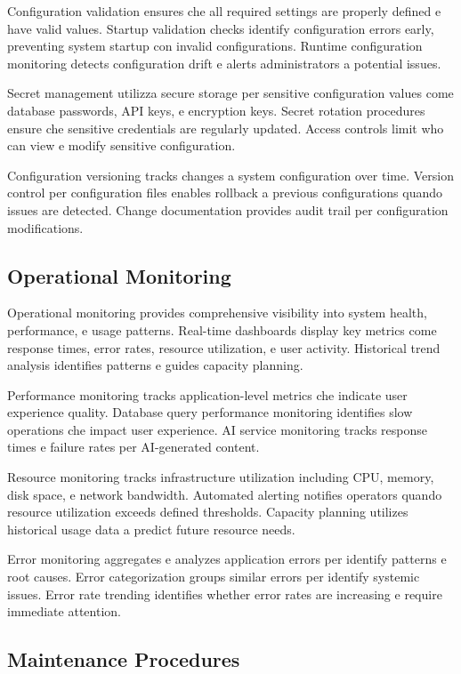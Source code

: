 \documentclass[12pt,a4paper]{article}
\begin{document}
Configuration validation ensures che all required settings are properly defined e have valid values. Startup validation checks identify configuration errors early, preventing system startup con invalid configurations. Runtime configuration monitoring detects configuration drift e alerts administrators a potential issues.

Secret management utilizza secure storage per sensitive configuration values come database passwords, API keys, e encryption keys. Secret rotation procedures ensure che sensitive credentials are regularly updated. Access controls limit who can view e modify sensitive configuration.

Configuration versioning tracks changes a system configuration over time. Version control per configuration files enables rollback a previous configurations quando issues are detected. Change documentation provides audit trail per configuration modifications.

\subsection{Operational Monitoring}

Operational monitoring provides comprehensive visibility into system health, performance, e usage patterns. Real-time dashboards display key metrics come response times, error rates, resource utilization, e user activity. Historical trend analysis identifies patterns e guides capacity planning.

Performance monitoring tracks application-level metrics che indicate user experience quality. Database query performance monitoring identifies slow operations che impact user experience. AI service monitoring tracks response times e failure rates per AI-generated content.

Resource monitoring tracks infrastructure utilization including CPU, memory, disk space, e network bandwidth. Automated alerting notifies operators quando resource utilization exceeds defined thresholds. Capacity planning utilizes historical usage data a predict future resource needs.

Error monitoring aggregates e analyzes application errors per identify patterns e root causes. Error categorization groups similar errors per identify systemic issues. Error rate trending identifies whether error rates are increasing e require immediate attention.

\subsection{Maintenance Procedures}
\end{document}
